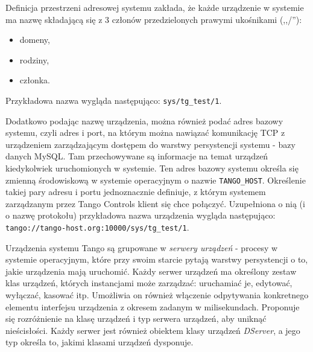 Definicja przestrzeni adresowej systemu zakłada, że każde urządzenie w systemie ma nazwę składającą się z 3 członów przedzielonych prawymi ukośnikami (,,/''):
\begin{itemize}
    \item domeny,
    \item rodziny,
    \item członka.
\end{itemize}
Przykładowa nazwa wygląda następująco: \texttt{sys/tg\_test/1}.

Dodatkowo podając nazwę urządzenia, można również podać adres bazowy systemu, czyli adres i port, na którym można nawiązać komunikację TCP z urządzeniem zarządzającym dostępem do warstwy persystencji systemu - bazy danych MySQL. Tam przechowywane są informacje na temat urządzeń kiedykolwiek uruchomionych w systemie. Ten adres bazowy systemu określa się zmienną środowiskową w systemie operacyjnym o nazwie \texttt{TANGO\_HOST}. Określenie takiej pary adresu i portu jednoznacznie definiuje, z którym systemem zarządzanym przez Tango Controls klient się chce połączyć. Uzupełniona o nią (i o nazwę protokołu) przykładowa nazwa urządzenia wygląda następująco: \texttt{tango://tango-host.org:10000/sys/tg\_test/1}.

Urządzenia systemu Tango są grupowane w \emph{serwery urządzeń} - procesy w systemie operacyjnym, które przy swoim starcie pytają warstwy persystencji o to, jakie urządzenia mają uruchomić. Każdy serwer urządzeń ma określony zestaw klas urządzeń, których instancjami może zarządzać: uruchamiać je, edytować, wyłączać, kasować itp. Umożliwia on również włączenie odpytywania konkretnego elementu interfejsu urządzenia z okresem zadanym w milisekundach. Proponuje się rozróżnienie na klasę urządzeń i typ serwera urządzeń, aby uniknąć nieścisłości. Każdy serwer jest również obiektem klasy urządzeń \emph{DServer}, a jego typ określa to, jakimi klasami urządzeń dysponuje.

